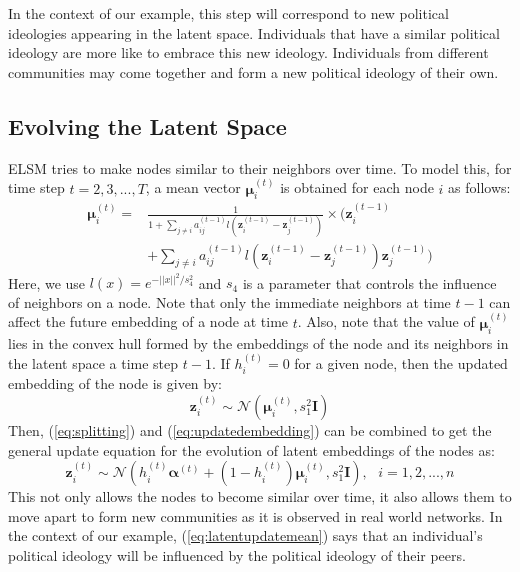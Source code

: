 \documentclass[letterpaper]{article}
\begin{document}
In the context of our example, this step will correspond to new political ideologies appearing in the latent space. Individuals that have a similar political ideology are more like to embrace this new ideology. Individuals from different communities may come together and form a new political ideology of their own.


\subsection{Evolving the Latent Space}
\label{section:evolvingthelatentspace}
ELSM tries to make nodes similar to their neighbors over time. To model this, for time step ${t} = 2, 3, ..., {T}$, a mean vector $\bm{\mu}_i^{(t)}$ is obtained for each node ${i}$ as follows:
\begin{equation}
\label{eq:latentupdatemean}
\begin{split}
    \bm{\mu}_i^{(t)} =& \frac{1}{1 + \sum_{j \neq i} {a_{ij}^{(t-1)}} l(\mathbf{z}_i^{(t-1)} - \mathbf{z}_j^{(t-1)})} \times    \Big(\mathbf{z}_i^{(t-1)} \\
    &+ \sum_{j \neq i} {a_{ij}^{(t-1)}} l(\mathbf{z}_i^{(t-1)} - \mathbf{z}_j^{(t-1)}) \mathbf{z}_j^{(t-1)}\Big)
\end{split}
\end{equation}
Here, we use $l(x) = e^{-||x||^2/{s_4^2}}$ and ${s_4}$ is a parameter that controls the influence of neighbors on a node. Note that only the immediate neighbors at time ${t-1}$ can affect the future embedding of a node at time ${t}$. Also, note that the value of $\bm{\mu}_i^{(t)}$ lies in the convex hull formed by the embeddings of the node and its neighbors in the latent space a time step $t-1$. If ${h_i^{(t)}} = 0$ for a given node, then the updated embedding of the node is given by:
\begin{equation}
    \label{eq:updatedembedding}
    \mathbf{z}_i^{(t)} \sim \mathcal{N}(\bm{\mu}_i^{(t)}, {s_1^2}\mathbf{I})
\end{equation}
Then, (\ref{eq:splitting}) and (\ref{eq:updatedembedding}) can be combined to get the general update equation for the evolution of latent embeddings of the nodes as:
\begin{equation}
    \label{eq:generalizedupdatedembedding}
    \mathbf{z}_i^{(t)} \sim \mathcal{N}({h_i^{(t)}}\bm{\alpha}^{(t)} + (1-{h_i^{(t)}})\bm{\mu}_i^{(t)}, {s_1^2}\mathbf{I}), \,\,\,\, {i} = 1, 2, ..., {n}
\end{equation}
This not only allows the nodes to become similar over time, it also allows them to move apart to form new communities as it is observed in real world networks. In the context of our example, (\ref{eq:latentupdatemean}) says that an individual's political ideology will be influenced by the political ideology of their peers.
\end{document}

